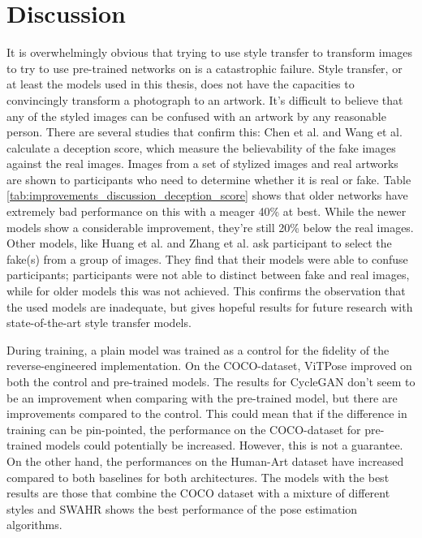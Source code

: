 \section{Discussion}
\label{improvements_discussion}
It is overwhelmingly obvious that trying to use style transfer to transform images to try to use pre-trained networks on is a catastrophic failure.
Style transfer, or at least the models used in this thesis, does not have the capacities to convincingly transform a photograph to an artwork.
It's difficult to believe that any of the styled images can be confused with an artwork by any reasonable person.
There are several studies that confirm this: Chen et al. \cite{Chen2021} and Wang et al. \cite{wang2022} calculate a deception score, which measure the believability of the fake images against the real images.
Images from a set of stylized images and real artworks are shown to participants who need to determine whether it is real or fake.
Table \ref{tab:improvements_discussion_deception_score} shows that older networks have extremely bad performance on this with a meager 40\% at best.
While the newer models show a considerable improvement, they're still 20\% below the real images.
Other models, like Huang et al. \cite{huang2023} and Zhang et al. \cite{zhang2023} ask participant to select the fake(s) from a group of images.
They find that their models were able to confuse participants; participants were not able to distinct between fake and real images, while for older models this was not achieved.
This confirms the observation that the used models are inadequate, but gives hopeful results for future research with state-of-the-art style transfer models.

During training, a plain model was trained as a control for the fidelity of the reverse-engineered implementation.
On the COCO-dataset, ViTPose improved on both the control and pre-trained models.
The results for CycleGAN don't seem to be an improvement when comparing with the pre-trained model, but there are improvements compared to the control.
This could mean that if the difference in training can be pin-pointed, the performance on the COCO-dataset for pre-trained models could potentially be increased.
However, this is not a guarantee.
On the other hand, the performances on the Human-Art dataset have increased compared to both baselines for both architectures.
The models with the best results are those that combine the COCO dataset with a mixture of different styles and SWAHR shows the best performance of the pose estimation algorithms.

